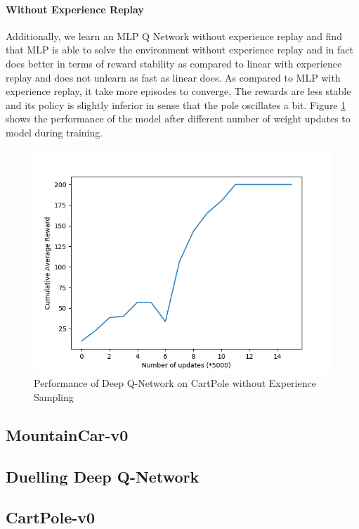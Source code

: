 \documentclass[12pt]{article}
\begin{document}
\paragraph{Without Experience Replay} Additionally, we learn an MLP Q Network without experience replay and find that MLP is able to solve the environment without experience replay and in fact does better in terms of reward stability as compared to linear with experience replay and does not unlearn as fast as linear does. As compared to MLP with experience replay, it take more episodes to converge, The rewards are less stable and its policy is slightly inferior in sense that the pole oscillates a bit. Figure \ref{fig:04} shows the performance of the model after different number of weight updates to model during training.

\begin{figure}[h]
  \centering
  \vspace{-5mm}
  \includegraphics[width=0.8\linewidth]{figures/reward_plot_03.png}
  \caption{Performance of Deep Q-Network on CartPole without Experience Sampling}
  \label{fig:04}
\end{figure}

\pagebreak[4]
\subsection*{MountainCar-v0}

\pagebreak[4]
\subsection{Duelling Deep Q-Network}
\subsection*{CartPole-v0}
\end{document}
